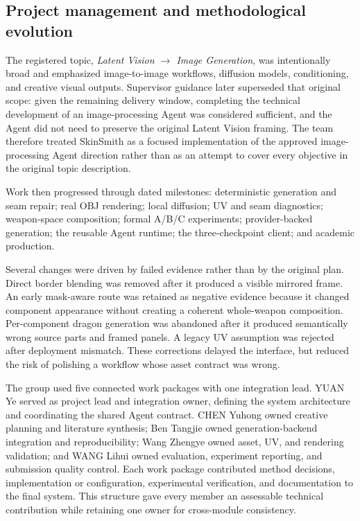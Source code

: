 \subsection{Project management and methodological evolution}

The registered topic, \emph{Latent Vision $\rightarrow$ Image Generation}, was
intentionally broad and emphasized image-to-image workflows, diffusion models,
conditioning, and creative visual outputs. Supervisor guidance later superseded
that original scope: given the remaining delivery window, completing the technical
development of an image-processing Agent was considered sufficient, and the Agent
did not need to preserve the original Latent Vision framing. The team therefore
treated SkinSmith as a focused implementation of the approved image-processing
Agent direction rather than as an attempt to cover every objective in the original
topic description.

Work then progressed through dated milestones: deterministic generation and seam
repair; real OBJ rendering; local diffusion; UV and seam diagnostics; weapon-space
composition; formal A/B/C experiments; provider-backed generation; the reusable
Agent runtime; the three-checkpoint client; and academic production.

Several changes were driven by failed evidence rather than by the original plan.
Direct border blending was removed after it produced a visible mirrored frame.
An early mask-aware route was retained as negative evidence because it changed
component appearance without creating a coherent whole-weapon composition.
Per-component dragon generation was abandoned after it produced semantically wrong
source parts and framed panels. A legacy UV assumption was rejected after
deployment mismatch. These corrections delayed the interface, but reduced the risk
of polishing a workflow whose asset contract was wrong.

The group used five connected work packages with one integration lead. YUAN Ye
served as project lead and integration owner, defining the system architecture and
coordinating the shared Agent contract. CHEN Yuhong owned creative planning and
literature synthesis; Ben Tangjie owned generation-backend integration and
reproducibility; Wang Zhengye owned asset, UV, and rendering validation; and WANG
Lihui owned evaluation, experiment reporting, and submission quality control.
Each work package contributed method decisions, implementation or configuration,
experimental verification, and documentation to the final system. This structure
gave every member an assessable technical contribution while retaining one owner
for cross-module consistency.

